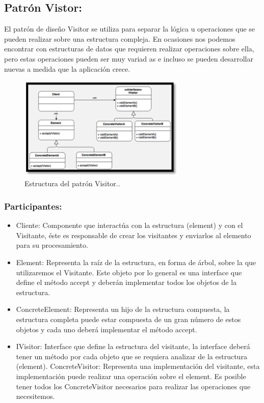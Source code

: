\documentclass[12pt,letterpaper]{article}
\begin{document}
\subsection{ Patrón Vistor:}
El patrón de diseño Visitor se utiliza para separar la lógica u operaciones que
 se pueden realizar sobre una estructura compleja. En ocasiones nos podemos encontrar 
 con estructuras de datos que requieren realizar operaciones sobre ella, pero estas
  operaciones pueden ser muy variad
  as e incluso se pueden desarrollar nuevas a medida 
  que la aplicación crece. 

\begin{figure}[h]
\begin{center}
\includegraphics[width=8cm]{./Imagenes/image2.png}
\caption{Estructura del patrón Visitor..}
\label{rg2}
\end{center}
\end{figure}


\subsubsection{Participantes:}
\begin{itemize}
\item Cliente: Componente que interactúa con la estructura (element) y con el Visitante, éste es responsable de crear los visitantes y enviarlos al elemento para su procesamiento. 
\item Element: Representa la raíz de la estructura, en forma de árbol, sobre la que utilizaremos el Visitante. Este objeto por lo general es una interface que define el método accept y deberán implementar todos los objetos de la estructura. 
\item ConcreteElement: Representa un hijo de la estructura compuesta, la estructura completa puede estar compuesta de un gran número de estos objetos y cada uno deberá implementar el método accept. 
\item IVisitor: Interface que define la estructura del visitante, la interface deberá tener un método por cada objeto que se requiera analizar de la estructura (element). 
ConcreteVisitor: Representa una implementación del visitante, esta implementación puede realizar una operación sobre el element. Es posible tener todos los ConcreteVisitor necesarios para realizar las operaciones que necesitemos. 

\end{itemize} 
\end{document}
